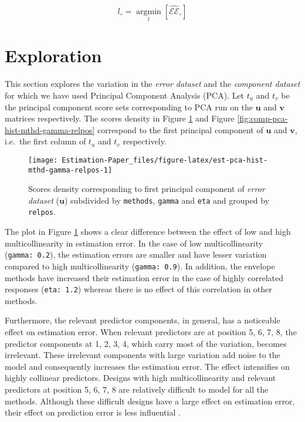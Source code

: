 \documentclass[12pt,3p,authoryear]{elsarticle}
\begin{document}
\begin{equation}
  l_{\circ} = \operatorname*{argmin}_{l}\left[\widehat{\mathcal{EE}}_{\circ}\right]
  \label{eq:min-comp}
\end{equation}

\hypertarget{exploration}{%
\section{Exploration}\label{exploration}}

This section explores the variation in the \emph{error dataset} and the \emph{component dataset} for which we have used Principal Component Analysis (PCA). Let \(t_u\) and \(t_v\) be the principal component score sets corresponding to PCA run on the \(\mathbf{u}\) and \(\mathbf{v}\) matrices respectively. The scores density in Figure \ref{fig:est-pca-hist-mthd-gamma-relpos} and Figure \ref{fig:comp-pca-hist-mthd-gamma-relpos} correspond to the first principal component of \(\mathbf{u}\) and \(\mathbf{v}\), i.e.~the first column of \(t_u\) and \(t_v\) respectively.



\begin{figure}[!htb]
\texttt{[image: Estimation-Paper\_files/figure-latex/est-pca-hist-mthd-gamma-relpos-1]} \caption{Scores density corresponding to first principal component of \emph{error dataset} (\(\mathbf{u}\)) subdivided by \texttt{methods}, \texttt{gamma} and \texttt{eta} and grouped by \texttt{relpos}.}\label{fig:est-pca-hist-mthd-gamma-relpos}
\end{figure}

The plot in Figure \ref{fig:est-pca-hist-mthd-gamma-relpos} shows a clear difference between the effect of low and high multicollinearity in estimation error. In the case of low multicollinearity (\texttt{gamma:\ 0.2}), the estimation errors are smaller and have lesser variation compared to high multicollinearity (\texttt{gamma:\ 0.9}). In addition, the envelope methods have increased their estimation error in the case of highly correlated responses (\texttt{eta:\ 1.2}) whereas there is no effect of this correlation in other methods.

Furthermore, the relevant predictor components, in general, has a noticeable effect on estimation error. When relevant predictors are at position 5, 6, 7, 8, the predictor components at 1, 2, 3, 4, which carry most of the variation, becomes irrelevant. These irrelevant components with large variation add noise to the model and consequently increases the estimation error. The effect intensifies on highly collinear predictors. Designs with high multicollinearity and relevant predictors at position 5, 6, 7, 8 are relatively difficult to model for all the methods. Although these difficult designs have a large effect on estimation error, their effect on prediction error is less influential \citep{rimal2019pred}.
\end{document}
